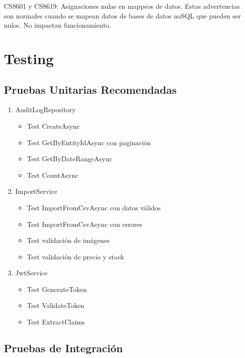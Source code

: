 \documentclass[12pt,a4paper]{article}
\begin{document}
CS8601 y CS8619: Asignaciones nulas en mappeos de datos. Estas advertencias son normales cuando se mapean datos de bases de datos noSQL que pueden ser nulos. No impactan funcionamiento.

\section{Testing}

\subsection{Pruebas Unitarias Recomendadas}

\begin{enumerate}
    \item AuditLogRepository
    \begin{itemize}
        \item Test CreateAsync
        \item Test GetByEntityIdAsync con paginación
        \item Test GetByDateRangeAsync
        \item Test CountAsync
    \end{itemize}

    \item ImportService
    \begin{itemize}
        \item Test ImportFromCsvAsync con datos válidos
        \item Test ImportFromCsvAsync con errores
        \item Test validación de imágenes
        \item Test validación de precio y stock
    \end{itemize}

    \item JwtService
    \begin{itemize}
        \item Test GenerateToken
        \item Test ValidateToken
        \item Test ExtractClaims
    \end{itemize}
\end{enumerate}

\subsection{Pruebas de Integración}
\end{document}
